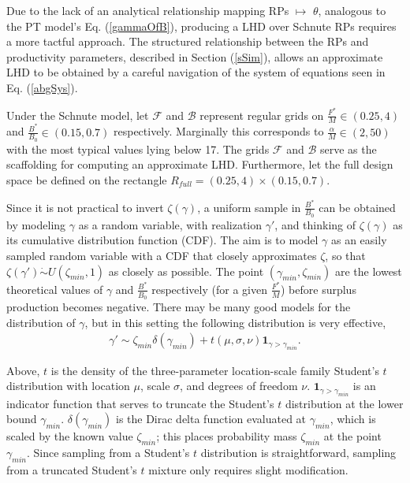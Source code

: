 Due to the lack of an analytical relationship mapping RPs $\mapsto$ $\theta$,
analogous to the PT model's Eq. (\ref{gammaOfB}), producing a LHD over Schnute 
RPs requires a more tactful approach.
The structured relationship between the RPs and productivity parameters,
described in Section (\ref{sSim}), allows an approximate LHD to be obtained by
a careful navigation of the system of equations seen in Eq. (\ref{abgSys}).

%
Under the Schnute model, let $\mathcal{F}$ and $\mathcal{B}$ represent regular grids on
\mbox{$\frac{F^*}{M}\in(0.25, 4)$} and \mbox{$\frac{B^*}{B_0}\in(0.15, 0.7)$}
respectively. Marginally this corresponds to $\frac{\alpha}{M}\in(2, 50)$ with the most typical values lying below 17. %
The grids $\mathcal{F}$ and $\mathcal{B}$ serve as the scaffolding for computing an approximate LHD.
Furthermore, let the full design space be defined on the rectangle $R_{full}=(0.25, 4)\times(0.15, 0.7)$.

%
Since it is not practical to invert $\zeta(\gamma)$, a uniform sample in
$\frac{B^*}{B_0}$ can be obtained by modeling $\gamma$ as a random
variable, with realization $\gamma'$, and thinking of $\zeta(\gamma)$ as its
cumulative distribution function (CDF). The aim is to model $\gamma$ as an
easily sampled random variable with a CDF that closely approximates $\zeta$, so
that $\zeta(\gamma')\dot\sim U(\zeta_{min},1)$ as closely as possible. The 
point $(\gamma_{min}, \zeta_{min})$ are the lowest %
theoretical values of $\gamma$ and $\frac{B^*}{B_0}$ respectively (for a given 
$\frac{F^*}{M}$) before surplus production becomes %
negative\cite{myers_maximum_1999, punt_extending_2019}. %
There may be many good models for the distribution of $\gamma$, but in this 
setting the following distribution is very effective,
%
%
%
%
\begin{align}
\gamma' \sim \zeta_{min}\delta(\gamma_{min}) + t(\mu, \sigma, \nu)\bm{1}_{\gamma>\gamma_{min}}. \label{mixT}
\end{align}

%
Above, $t$ is the density of the three-parameter location-scale family Student's $t$
distribution with location $\mu$, scale $\sigma$, and degrees of freedom $\nu$.
$\bm{1}_{\gamma>\gamma_{min}}$ is an indicator function that serves to truncate the
Student's $t$ distribution at the lower bound $\gamma_{min}$.
$\delta(\gamma_{min})$ is the Dirac delta function evaluated at $\gamma_{min}$,
which is scaled by the known value $\zeta_{min}$; this places probability mass
$\zeta_{min}$ at the point $\gamma_{min}$. Since sampling from a Student's $t$
distribution is straightforward, sampling from a truncated Student's $t$ mixture
only requires slight modification.

